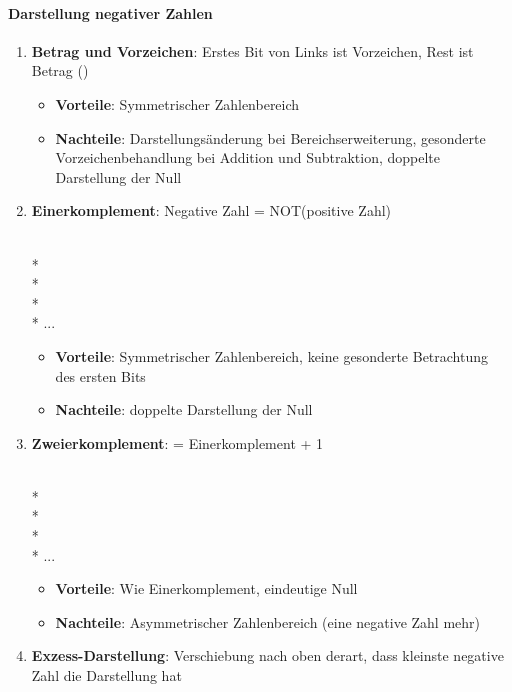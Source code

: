 \paragraph{Darstellung negativer Zahlen}
\begin{enumerate}
	\item \textbf{Betrag und Vorzeichen}: Erstes Bit von Links ist Vorzeichen, Rest ist Betrag ()
	\begin{itemize}
		\item \textbf{Vorteile}: Symmetrischer Zahlenbereich
		\item \textbf{Nachteile}: Darstellungsänderung bei Bereichserweiterung, gesonderte Vorzeichenbehandlung bei Addition und Subtraktion, doppelte Darstellung der Null
	\end{itemize}

	\item \textbf{Einerkomplement}: Negative Zahl = NOT(positive Zahl)
	\begin{center}
		 \quad {} \\*
		 \quad {} \\*
		 \quad {} \\*
		 \quad {} \\*
		...
	\end{center}
	\begin{itemize}
		\item \textbf{Vorteile}: Symmetrischer Zahlenbereich, keine gesonderte Betrachtung des ersten Bits
		\item \textbf{Nachteile}: doppelte Darstellung der Null
	\end{itemize}

	\item \textbf{Zweierkomplement}: = Einerkomplement + 1
	\begin{center}
		 \quad {} \\*
		 \quad {} \\*
		 \quad {} \\*
		 \quad {} \\*
		...
	\end{center}
	\begin{itemize}
		\item \textbf{Vorteile}: Wie Einerkomplement, eindeutige Null
		\item \textbf{Nachteile}: Asymmetrischer Zahlenbereich (eine negative Zahl mehr)
	\end{itemize}

	\item \textbf{Exzess-Darstellung}: Verschiebung nach oben derart, dass kleinste negative Zahl die Darstellung  hat
\end{enumerate}

